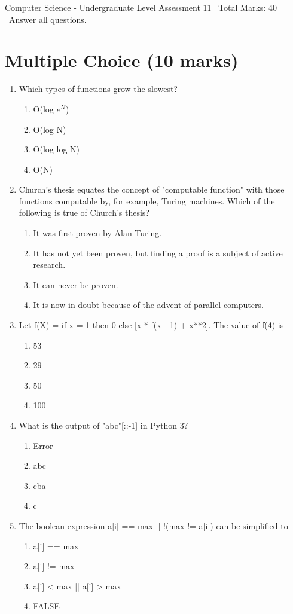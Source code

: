 \documentclass[12pt]{article}
\begin{document}
\begin{center}
Computer Science - Undergraduate Level Assessment 11 \
Total Marks: 40 \
Answer all questions.
\end{center}

\section*{Multiple Choice (10 marks)}
\begin{enumerate}[label=\arabic*.]
\item Which types of functions grow the slowest?
\begin{enumerate}[label=(\alph*)]
    \item O(log $e^N$)
    \item O(log N)
    \item O(log log N)
    \item O(N)
\end{enumerate}
\item Church's thesis equates the concept of "computable function" with those functions computable by, for example, Turing machines. Which of the following is true of Church's thesis?
\begin{enumerate}[label=(\alph*)]
    \item It was first proven by Alan Turing.
    \item It has not yet been proven, but finding a proof is a subject of active research.
    \item It can never be proven.
    \item It is now in doubt because of the advent of parallel computers.
\end{enumerate}
\item Let f(X) = if x = 1 then 0 else [x * f(x - 1) + x**2]. The value of f(4) is
\begin{enumerate}[label=(\alph*)]
    \item 53
    \item 29
    \item 50
    \item 100
\end{enumerate}
\item What is the output of "abc"[::-1] in Python 3?
\begin{enumerate}[label=(\alph*)]
    \item Error
    \item abc
    \item cba
    \item c
\end{enumerate}
\item The boolean expression a[i] == max || !(max != a[i]) can be simplified to
\begin{enumerate}[label=(\alph*)]
    \item a[i] == max
    \item a[i] != max
    \item a[i] \textless{} max || a[i] \textgreater{} max
    \item FALSE
\end{enumerate}
\end{enumerate}
\end{document}
